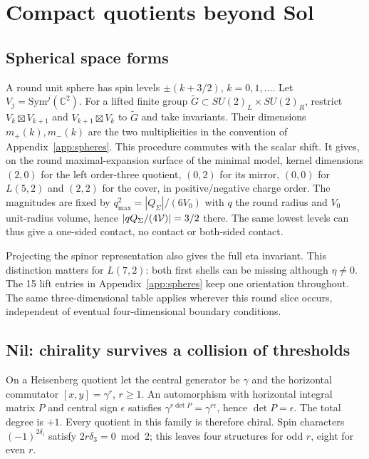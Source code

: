 \section{Compact quotients beyond Sol}\label{sec:catalog}
\subsection{Spherical space forms}
A round unit sphere has spin levels \(\pm(k+3/2)\), \(k=0,1,\ldots\). Let \(V_j=\mathrm{Sym}^j(\mathbb C^2)\). For a lifted finite group \(\widetilde G\subset SU(2)_L\times SU(2)_R\), restrict \(V_k\boxtimes V_{k+1}\) and \(V_{k+1}\boxtimes V_k\) to \(\widetilde G\) and take invariants. Their dimensions \(m_+(k),m_-(k)\) are the two multiplicities in the convention of Appendix~\ref{app:spheres}. This procedure commutes with the scalar shift. It gives, on the round maximal-expansion surface of the minimal model, kernel dimensions \((2,0)\) for the left order-three quotient, \((0,2)\) for its mirror, \((0,0)\) for \(L(5,2)\) and \((2,2)\) for the cover, in positive/negative charge order. The magnitudes are fixed by \(q^2_{\max}=|Q_\Sigma|/(6V_0)\) with \(q\) the round radius and \(V_0\) unit-radius volume, hence \(|qQ_\Sigma/(4\mathcal V)|=3/2\) there. The same lowest levels can thus give a one-sided contact, no contact or both-sided contact.

Projecting the spinor representation also gives the full eta invariant. This distinction matters for \(L(7,2)\): both first shells can be missing although \(\eta\ne0\). The 15 lift entries in Appendix~\ref{app:spheres} keep one orientation throughout. The same three-dimensional table applies wherever this round slice occurs, independent of eventual four-dimensional boundary conditions.

\subsection{Nil: chirality survives a collision of thresholds}
On a Heisenberg quotient let the central generator be \(\gamma\) and the horizontal commutator \([x,y]=\gamma^r\), \(r\ge1\). An automorphism with horizontal integral matrix \(P\) and central sign \(\epsilon\) satisfies \(\gamma^{r\det P}=\gamma^{r\epsilon}\), hence \(\det P=\epsilon\). The total degree is \(+1\). Every quotient in this family is therefore chiral. Spin characters \((-1)^{2\delta_i}\) satisfy \(2r\delta_3=0\bmod2\); this leaves four structures for odd \(r\), eight for even \(r\).

